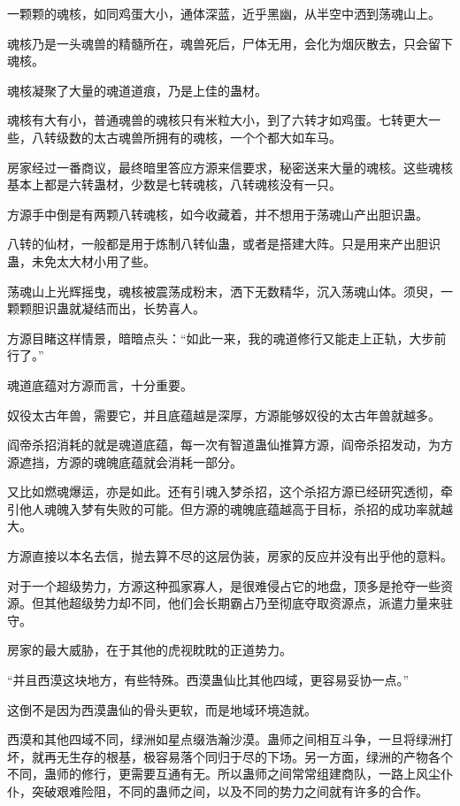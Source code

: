
\begin{this_body}



一颗颗的魂核，如同鸡蛋大小，通体深蓝，近乎黑幽，从半空中洒到荡魂山上。

魂核乃是一头魂兽的精髓所在，魂兽死后，尸体无用，会化为烟灰散去，只会留下魂核。

魂核凝聚了大量的魂道道痕，乃是上佳的蛊材。

魂核有大有小，普通魂兽的魂核只有米粒大小，到了六转才如鸡蛋。七转更大一些，八转级数的太古魂兽所拥有的魂核，一个个都大如车马。

房家经过一番商议，最终暗里答应方源来信要求，秘密送来大量的魂核。这些魂核基本上都是六转蛊材，少数是七转魂核，八转魂核没有一只。

方源手中倒是有两颗八转魂核，如今收藏着，并不想用于荡魂山产出胆识蛊。

八转的仙材，一般都是用于炼制八转仙蛊，或者是搭建大阵。只是用来产出胆识蛊，未免太大材小用了些。

荡魂山上光辉摇曳，魂核被震荡成粉末，洒下无数精华，沉入荡魂山体。须臾，一颗颗胆识蛊就凝结而出，长势喜人。

方源目睹这样情景，暗暗点头：“如此一来，我的魂道修行又能走上正轨，大步前行了。”

魂道底蕴对方源而言，十分重要。

奴役太古年兽，需要它，并且底蕴越是深厚，方源能够奴役的太古年兽就越多。

阎帝杀招消耗的就是魂道底蕴，每一次有智道蛊仙推算方源，阎帝杀招发动，为方源遮挡，方源的魂魄底蕴就会消耗一部分。

又比如燃魂爆运，亦是如此。还有引魂入梦杀招，这个杀招方源已经研究透彻，牵引他人魂魄入梦有失败的可能。但方源的魂魄底蕴越高于目标，杀招的成功率就越大。

方源直接以本名去信，抛去算不尽的这层伪装，房家的反应并没有出乎他的意料。

对于一个超级势力，方源这种孤家寡人，是很难侵占它的地盘，顶多是抢夺一些资源。但其他超级势力却不同，他们会长期霸占乃至彻底夺取资源点，派遣力量来驻守。

房家的最大威胁，在于其他的虎视眈眈的正道势力。

“并且西漠这块地方，有些特殊。西漠蛊仙比其他四域，更容易妥协一点。”

这倒不是因为西漠蛊仙的骨头更软，而是地域环境造就。

西漠和其他四域不同，绿洲如星点缀浩瀚沙漠。蛊师之间相互斗争，一旦将绿洲打坏，就再无生存的根基，极容易落个同归于尽的下场。另一方面，绿洲的产物各个不同，蛊师的修行，更需要互通有无。所以蛊师之间常常组建商队，一路上风尘仆仆，突破艰难险阻，不同的蛊师之间，以及不同的势力之间就有许多的合作。


\end{this_body}
